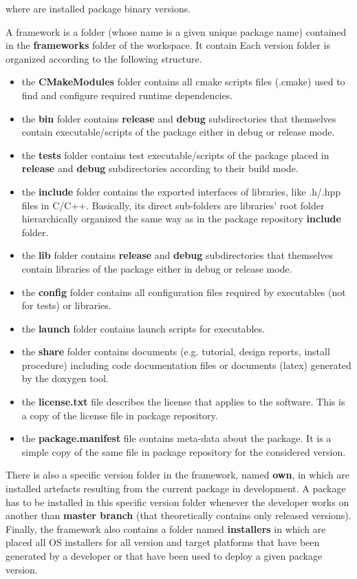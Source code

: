 \documentclass[12pt,a4paper]{article}
\begin{document}
where are installed package binary versions.
 
A framework is a folder (whose name is a given unique package name) contained in the \textbf{frameworks} folder of the workspace. It contain Each version folder is organized according to the following structure. 
\begin{itemize}
\item the \textbf{CMakeModules} folder contains all cmake scripts files (.cmake) used to find and configure required runtime dependencies.
\item the \textbf{bin} folder contains \textbf{release} and \textbf{debug} subdirectories that themselves contain executable/scripts of the package either in debug or release mode.
\item the \textbf{tests} folder contains test executable/scripts of the package placed in \textbf{release} and \textbf{debug} subdirectories according to their build mode.
\item the \textbf{include} folder contains the exported interfaces of libraries, like .h/.hpp files in C/C++. Basically, its direct sub-folders are libraries' root folder hierarchically organized the same way as in the package repository \textbf{include} folder.
\item the \textbf{lib} folder contains \textbf{release} and \textbf{debug} subdirectories that themselves contain libraries of the package either in debug or release mode.
\item the \textbf{config} folder contains all configuration files required by executables (not for tests) or libraries.
\item the \textbf{launch} folder contains launch scripts for executables.
\item the \textbf{share} folder contains documents (e.g. tutorial, design reports, install procedure) including code documentation files or documents (latex) generated by the doxygen tool.
\item the \textbf{license.txt} file describes the license that applies to the software. This is a copy of the license file in package repository.
\item the \textbf{package.manifest} file contains meta-data about the package. It is a simple copy of the same file in package repository for the considered version.
\end{itemize}
There is also a specific version folder in the framework, named \textbf{own}, in which are installed artefacts resulting from the current package in development. A package has to be installed in this specific version folder whenever the developer works on another than \textbf{master branch} (that theoretically contains only released versions).
Finally, the framework also contains a folder named \textbf{installers} in which are placed all OS installers for all version and target platforms that have been generated by a developer or that have been used to deploy a given package version.
\end{document}
